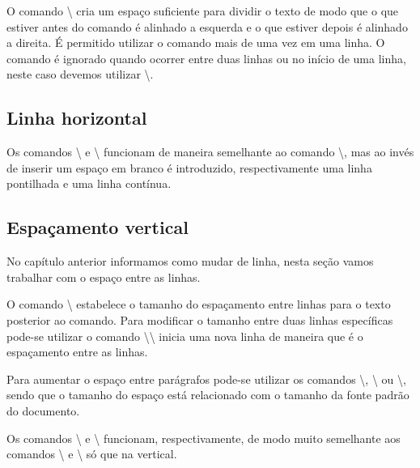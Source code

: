 O comando \textbackslash{} cria um espaço suficiente para dividir o texto de modo que o que estiver antes do comando é alinhado a esquerda e o que estiver depois é alinhado a direita. É permitido utilizar o comando mais de uma vez em uma linha. O comando é ignorado quando ocorrer entre duas linhas ou no início de uma linha, neste caso devemos utilizar  \textbackslash{}\textasteriskcentered.

\subsection{Linha horizontal}
Os comandos \textbackslash{} e \textbackslash{} funcionam de maneira semelhante ao comando \textbackslash{}, mas ao invés de inserir um espaço em branco é introduzido, respectivamente uma linha pontilhada e uma linha contínua.

\subsection{Espaçamento vertical}
No capítulo anterior informamos como mudar de linha, nesta seção vamos trabalhar com o espaço entre as linhas.

O comando \textbackslash{} estabelece o tamanho do espaçamento entre linhas para o texto posterior ao comando. Para modificar o tamanho entre duas linhas específicas pode-se utilizar o comando \textbackslash\textbackslash\lcode{[tam]} inicia uma nova linha de maneira que  é o espaçamento entre as linhas.

Para aumentar o espaço entre parágrafos pode-se utilizar os comandos \textbackslash{}, \textbackslash{} ou \textbackslash{}, sendo que o tamanho do espaço está relacionado com o tamanho da fonte padrão do documento.

Os comandos \textbackslash{} e \textbackslash{} funcionam, respectivamente, de modo muito semelhante aos comandos \textbackslash{} e \textbackslash{} só que na vertical.

